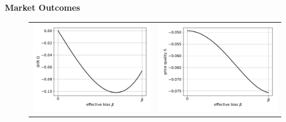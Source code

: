 \documentclass{article}
\begin{document}
\pagebreak
\begin{center}
	\textbf{Market Outcomes}
\end{center}
\begin{figure}[h]
	\begin{center}
		\begin{tabular}{cc}
			\includegraphics[scale=.5]{effective_bias_drift} & \includegraphics[scale=.5]{effective_bias_price_quality} \\

\end{tabular}
\end{center}
\end{figure}
\end{document}
